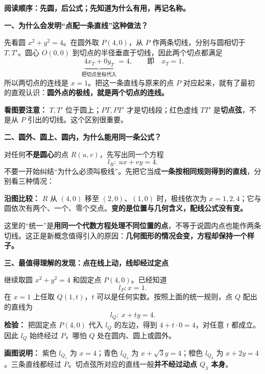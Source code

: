 \begin{explanationbox}
\textbf{\textcolor{CExplanation}{阅读顺序：先圆，后公式；先知道为什么有用，再记名称。}}

\medskip
\textbf{\textcolor{CExplanation}{一、为什么会发明“点配一条直线”这种做法？}}

先看圆 $x^2+y^2=4$。在圆外取 $P(4,0)$，从 $P$ 作两条切线，分别与圆相切于 $T,T'$。圆心 $O(0,0)$ 到切点的半径垂直于切线，因此两个切点都满足
\[
\underbrace{4x_{T}+0y_{T}}_{\text{把切点坐标代入}}=4,
\qquad\text{即}\quad x_T=1.
\]
所以两切点的连线是 $x=1$。把这一条直线与原来的点 $P$ 对应起来，就有了最初的直观认识：\textbf{圆外点的极线，就是两个切点的连线。}

\begin{center}

\end{center}
\textbf{看图要注意：} $T,T'$ 位于圆上；$PT,PT'$ 才是切线段；红色虚线 $TT'$ 是\textbf{切点弦}，不是从 $P$ 引出的切线。这个区别很重要。

\medskip
\textbf{\textcolor{CExplanation}{二、圆外、圆上、圆内，为什么能用同一条公式？}}

对任何\textbf{不是圆心}的点 $R(u,v)$，先写出同一个方程
\[
\boxed{l_R:\ ux+vy=4}.
\]
不要一开始纠结“为什么必须叫极线”。先把它当成\textbf{一条按相同规则得到的直线}，分别看三种情况：

\begin{center}

\end{center}
\textbf{沿图比较：} $R$ 从 $(4,0)$ 移至 $(2,0)$、$(1,0)$ 时，极线依次为 $x=1,2,4$；它与圆依次有两个、一个、零个交点。\textbf{变的是位置与几何含义，配线公式没有变。}

这里的“统一”是\textbf{用同一个代数方程处理不同位置的点}，不等于说圆内点也能作两条切线。这正是新概念值得引入的原因：\textbf{几何图形的情况会变，方程却保持一个样子。}

\medskip
\textbf{\textcolor{CExplanation}{三、最值得理解的发现：点在线上动，线却经过定点}}

继续取圆 $x^2+y^2=4$ 和固定点 $P(4,0)$。已经知道
\[
 l_P:x=1.
\]
在 $x=1$ 上任取 $Q(1,t)$，$t$ 可以是任何实数。按照上面的统一规则，点 $Q$ 配出的直线为
\[
\boxed{l_Q:\ x+ty=4}.
\]
\textbf{检验：} 把固定点 $P(4,0)$ 代入 $l_Q$ 的左边，得到 $4+t\cdot0=4$，对任意 $t$ 都成立。因此 $l_Q$ 始终经过 $P$，哪怕 $Q$ 处在圆内、圆上或圆外。

\begin{center}

\end{center}
\textbf{画图说明：} 紫色 $l_{Q_1}$ 为 $x=4$；青色 $l_{Q_2}$ 为 $x+\sqrt3y=4$；橙色 $l_{Q_3}$ 为 $x+2y=4$。三条直线都经过 $P$。切点弦所对应的直线一般\textbf{并不经过动点 $Q_3$ 本身}。


\end{explanationbox}
